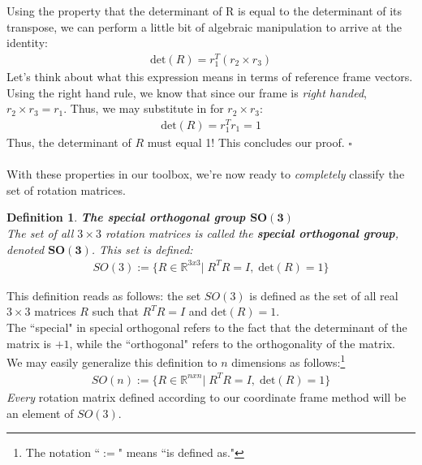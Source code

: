 \documentclass[oneside]{book}
\newtheorem{definition}{Definition}
\newenvironment{defn} %
  {\colorlet{shadecolor}{orange!15}\begin{shaded}\begin{definition}}
  {\end{definition}\end{shaded}}
\begin{document}
Using the property that the determinant of R is equal to the determinant of its transpose, we can perform a little bit of algebraic manipulation to arrive at the identity:
\begin{align}
    \mathrm{det}(R) = r_1^T(r_2\times r_3)
\end{align}
Let's think about what this expression means in terms of reference frame vectors. Using the right hand rule, we know that since our frame is \textit{right handed}, $r_2 \times r_3 = r_1$. Thus, we may substitute in for $r_2 \times r_3$:
\begin{align}
    \mathrm{det}(R) = r_1^Tr_1 = 1
\end{align}
Thus, the determinant of $R$ must equal 1! This concludes our proof. $\square$ \\\\
With these properties in our toolbox, we're now ready to \textit{completely} classify the set of rotation matrices.
\begin{defn}
\textbf{The special orthogonal group $\mathbf{SO(3)}$}\\
The set of all $3\times 3$ rotation matrices is called the \textbf{special orthogonal group}, denoted $\mathbf{SO(3)}$. This set is defined:
\begin{align}
    SO(3) := \{R\in \mathbb{R}^{3x3}| \; R^TR = I,\; \mathrm{det}(R) = 1\}
\end{align}
\end{defn}\noindent
This definition reads as follows: the set $SO(3)$ is defined as the set of all real $3\times 3$ matrices $R$ such that $R^TR = I$ and $\mathrm{det}(R) = 1$.\\
The ``special" in special orthogonal refers to the fact that the determinant of the matrix is $+1$, while the ``orthogonal" refers to the orthogonality of the matrix.\\
We may easily generalize this definition to $n$ dimensions as follows:\footnote{The notation ``$:=$" means ``is defined as." }
\begin{align}
    SO(n) := \{R\in \mathbb{R}^{nxn}| \; R^TR = I,\; \mathrm{det}(R) = 1\}
\end{align}
\textit{Every} rotation matrix defined according to our coordinate frame method will be an element of $SO(3)$.
\end{document}

